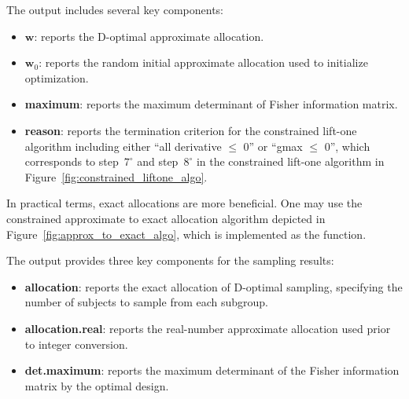 \noindent The output includes several key components:
\begin{itemize}
    \item $\mathbf w$: reports the D-optimal approximate allocation.
    \item $\mathbf w_0$: reports the random initial approximate allocation used to initialize optimization.
    \item \textbf{maximum}: reports the maximum determinant of Fisher information matrix.
    \item \textbf{reason}: reports the termination criterion for the constrained lift-one algorithm including either ``all derivative $\le$ 0'' or ``gmax $\le$ 0'', which corresponds to step~$7^\circ$ and step~$8^\circ$ in the constrained lift-one algorithm in Figure~\ref{fig:constrained_liftone_algo}.
\end{itemize}

In practical terms, exact allocations are more beneficial. One may use the constrained approximate to exact allocation algorithm depicted in Figure~\ref{fig:approx_to_exact_algo}, which is implemented as the \texttt{} function.


\noindent The output provides three key components for the sampling results:
\begin{itemize}
    \item \textbf{allocation}: reports the exact allocation of D-optimal sampling, specifying the number of subjects to sample from each subgroup.
    \item \textbf{allocation.real}: reports the real-number approximate allocation used prior to integer conversion.
    \item \textbf{det.maximum}: reports the maximum determinant of the Fisher information matrix by the optimal design.
\end{itemize}

